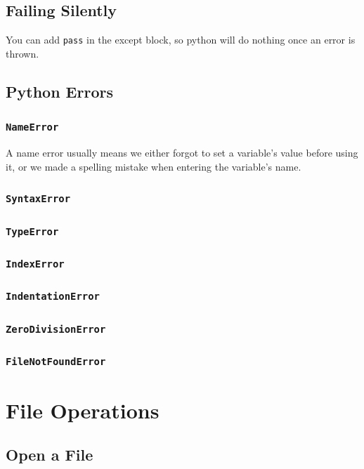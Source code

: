 \documentclass[12pt]{book}
\begin{document}
\section{Failing Silently}
\label{sec:orgce6ed21}
You can add \texttt{pass} in the except block, so python will do nothing once an error is thrown.
\section{Python Errors}
\label{sec:org4db9e40}
\subsection{\texttt{NameError}}
\label{sec:org0c3fdc9}
A name error usually means we either forgot to set a variable’s value before using it, or we made a spelling mistake when entering the variable’s name.
\subsection{\texttt{SyntaxError}}
\label{sec:org84e467e}
\subsection{\texttt{TypeError}}
\label{sec:orgbd65624}
\subsection{\texttt{IndexError}}
\label{sec:org4696b92}
\subsection{\texttt{IndentationError}}
\label{sec:org303a820}
\subsection{\texttt{ZeroDivisionError}}
\label{sec:org5aa62b5}
\subsection{\texttt{FileNotFoundError}}
\label{sec:orgde60ff3}
\chapter{File Operations}
\label{sec:orgb724ff7}
\section{Open a File}
\label{sec:org276ad9d}
\end{document}
